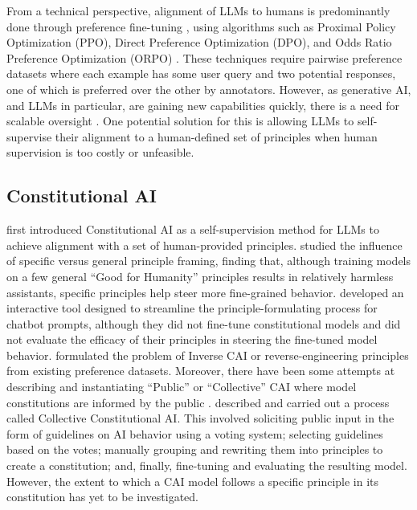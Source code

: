 From a technical perspective, alignment of LLMs to humans is predominantly done through preference fine-tuning \cite{ouyang2022training,bai2022training,casper2023open}, using algorithms such as Proximal Policy Optimization (PPO), Direct Preference Optimization (DPO), and Odds Ratio Preference Optimization (ORPO) \cite{ouyang2022training,rafailov2024direct,hong-etal-2024-orpo}. These techniques require pairwise preference datasets where each example has some user query and two potential responses, one of which is preferred over the other by annotators. However, as generative AI, and LLMs in particular, are gaining new capabilities quickly, there is a need for scalable oversight \cite{bowman2022measuring}. One potential solution for this is allowing LLMs to self-supervise their alignment to a human-defined set of principles \cite{ganguli2023capacity, sun2023salmon,chen2024iteralign} when human supervision is too costly or unfeasible. 

\subsection{Constitutional AI}
\citet{bai2022constitutional} first introduced Constitutional AI as a self-supervision method for LLMs to achieve alignment with a set of human-provided principles. \citet{kundu2023specific} studied the influence of specific versus general principle framing, finding that, although training models on a few general ``Good for Humanity'' principles results in relatively harmless assistants, specific principles help steer more fine-grained behavior. \citet{petridis2024constitutionmaker} developed an interactive tool designed to streamline the principle-formulating process for chatbot prompts, although they did not fine-tune constitutional models and did not evaluate the efficacy of their principles in steering the fine-tuned model behavior. \citet{findeis2024inverse} formulated the problem of Inverse CAI or reverse-engineering principles from existing preference datasets. Moreover, there have been some attempts at describing and instantiating ``Public'' or ``Collective'' CAI where model constitutions are informed by the public \cite{abiri2024public,huang2024collective}. \citet{huang2024collective} described and carried out a process called Collective Constitutional AI. This involved soliciting public input in the form of guidelines on AI behavior using a voting system; selecting guidelines based on the votes; manually grouping and rewriting them into principles to create a constitution; and, finally, fine-tuning and evaluating the resulting model. However, the extent to which a CAI model follows a specific principle in its constitution has yet to be investigated. 

